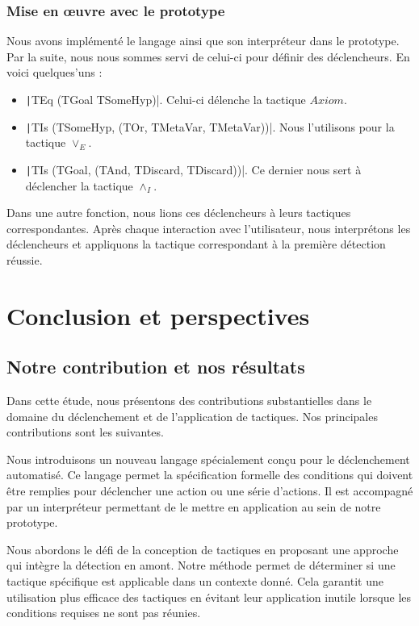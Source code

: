 \documentclass[french,titlepage]{article}
\begin{document}
\subsubsection{Mise en œuvre avec le prototype}
Nous avons implémenté le langage ainsi que son interpréteur dans le prototype. Par la suite, nous nous sommes servi de celui-ci pour définir des déclencheurs. En voici quelques'uns :
\begin{itemize}
    \item \texttt|TEq (TGoal TSomeHyp)|. Celui-ci délenche la tactique $Axiom$.
    \item \texttt|TIs (TSomeHyp, (TOr, TMetaVar, TMetaVar))|. Nous l'utilisons pour la tactique $\lor_E$.
    \item \texttt|TIs (TGoal, (TAnd, TDiscard, TDiscard))|. Ce dernier nous sert à déclencher la tactique $\land_I$.
\end{itemize}
Dans une autre fonction, nous lions ces déclencheurs à leurs tactiques correspondantes. Après chaque interaction avec l'utilisateur, nous interprétons les déclencheurs et appliquons la tactique correspondant à la première détection réussie.

\section{Conclusion et perspectives} \label{conclusion}
\subsection{Notre contribution et nos résultats} \label{conclusion:contribution_resultats}
Dans cette étude, nous présentons des contributions substantielles dans le domaine du déclenchement et de l'application de tactiques. Nos principales contributions sont les suivantes.

Nous introduisons un nouveau langage spécialement conçu pour le déclenchement automatisé. Ce langage permet la spécification formelle des conditions qui doivent être remplies pour déclencher une action ou une série d'actions. Il est accompagné par un interpréteur permettant de le mettre en application au sein de notre prototype.

Nous abordons le défi de la conception de tactiques en proposant une approche qui intègre la détection en amont. Notre méthode permet de déterminer si une tactique spécifique est applicable dans un contexte donné. Cela garantit une utilisation plus efficace des tactiques en évitant leur application inutile lorsque les conditions requises ne sont pas réunies.
\end{document}
